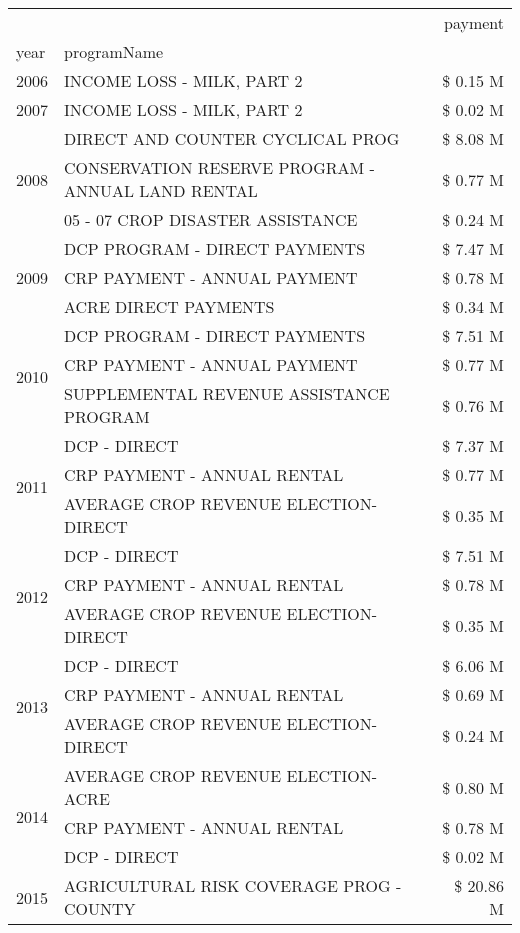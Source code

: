 \begin{tabular}{llr}
\toprule
 &  & payment \\
year & programName &  \\
\midrule
2006 & INCOME LOSS - MILK, PART 2 & \$ 0.15 M \\
\cline{1-3}
2007 & INCOME LOSS - MILK, PART 2 & \$ 0.02 M \\
\cline{1-3}
\multirow[t]{3}{*}{2008} & DIRECT AND COUNTER CYCLICAL PROG & \$ 8.08 M \\
 & CONSERVATION RESERVE PROGRAM - ANNUAL LAND RENTAL & \$ 0.77 M \\
 & 05 - 07 CROP DISASTER ASSISTANCE & \$ 0.24 M \\
\cline{1-3}
\multirow[t]{3}{*}{2009} & DCP PROGRAM - DIRECT PAYMENTS & \$ 7.47 M \\
 & CRP PAYMENT - ANNUAL PAYMENT & \$ 0.78 M \\
 & ACRE DIRECT PAYMENTS & \$ 0.34 M \\
\cline{1-3}
\multirow[t]{3}{*}{2010} & DCP PROGRAM - DIRECT PAYMENTS & \$ 7.51 M \\
 & CRP PAYMENT - ANNUAL PAYMENT & \$ 0.77 M \\
 & SUPPLEMENTAL REVENUE ASSISTANCE PROGRAM & \$ 0.76 M \\
\cline{1-3}
\multirow[t]{3}{*}{2011} & DCP - DIRECT & \$ 7.37 M \\
 & CRP PAYMENT - ANNUAL RENTAL & \$ 0.77 M \\
 & AVERAGE CROP REVENUE ELECTION-DIRECT & \$ 0.35 M \\
\cline{1-3}
\multirow[t]{3}{*}{2012} & DCP - DIRECT & \$ 7.51 M \\
 & CRP PAYMENT - ANNUAL RENTAL & \$ 0.78 M \\
 & AVERAGE CROP REVENUE ELECTION-DIRECT & \$ 0.35 M \\
\cline{1-3}
\multirow[t]{3}{*}{2013} & DCP - DIRECT & \$ 6.06 M \\
 & CRP PAYMENT - ANNUAL RENTAL & \$ 0.69 M \\
 & AVERAGE CROP REVENUE ELECTION-DIRECT & \$ 0.24 M \\
\cline{1-3}
\multirow[t]{3}{*}{2014} & AVERAGE CROP REVENUE ELECTION-ACRE & \$ 0.80 M \\
 & CRP PAYMENT - ANNUAL RENTAL & \$ 0.78 M \\
 & DCP - DIRECT & \$ 0.02 M \\
\cline{1-3}
\multirow[t]{3}{*}{2015} & AGRICULTURAL RISK COVERAGE PROG - COUNTY & \$ 20.86 M \\

\end{tabular}
